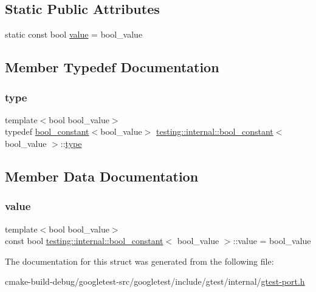 \subsection*{Static Public Attributes}
\begin{DoxyCompactItemize}
\item 
static const bool \mbox{\hyperlink{structtesting_1_1internal_1_1bool__constant_a499fba6576296b04d99690a486424b32}{value}} = bool\+\_\+value
\end{DoxyCompactItemize}


\subsection{Member Typedef Documentation}
\mbox{\label{structtesting_1_1internal_1_1bool__constant_aba6d09ecf7eecea6c93480f0d627a167}} 
\subsubsection{\texorpdfstring{type}{type}}
{\footnotesize\ttfamily template$<$bool bool\+\_\+value$>$ \\
typedef \mbox{\hyperlink{structtesting_1_1internal_1_1bool__constant}{bool\+\_\+constant}}$<$bool\+\_\+value$>$ \mbox{\hyperlink{structtesting_1_1internal_1_1bool__constant}{testing\+::internal\+::bool\+\_\+constant}}$<$ bool\+\_\+value $>$\+::\mbox{\hyperlink{structtesting_1_1internal_1_1bool__constant_aba6d09ecf7eecea6c93480f0d627a167}{type}}}



\subsection{Member Data Documentation}
\mbox{\label{structtesting_1_1internal_1_1bool__constant_a499fba6576296b04d99690a486424b32}} 
\subsubsection{\texorpdfstring{value}{value}}
{\footnotesize\ttfamily template$<$bool bool\+\_\+value$>$ \\
const bool \mbox{\hyperlink{structtesting_1_1internal_1_1bool__constant}{testing\+::internal\+::bool\+\_\+constant}}$<$ bool\+\_\+value $>$\+::value = bool\+\_\+value\hspace{0.3cm}{\ttfamily [static]}}



The documentation for this struct was generated from the following file\+:\begin{DoxyCompactItemize}
\item 
cmake-\/build-\/debug/googletest-\/src/googletest/include/gtest/internal/\mbox{\hyperlink{gtest-port_8h}{gtest-\/port.\+h}}\end{DoxyCompactItemize}

